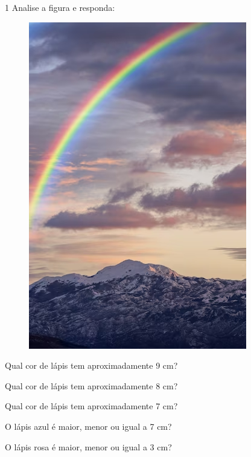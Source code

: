 \pagebreak
{}

\num{1} Analise a figura e responda:

\begin{figure}[htpb!]
\includegraphics[width=\textwidth]{./media/image30.png}
\end{figure}

\begin{escolha}
\item  Qual cor de lápis tem aproximadamente 9 cm?


\item  Qual cor de lápis tem aproximadamente 8 cm?


\item  Qual cor de lápis tem aproximadamente 7 cm?


\item  O lápis azul é maior, menor ou igual a 7 cm?


\item  O lápis rosa é maior, menor ou igual a 3 cm?

\end{escolha}

